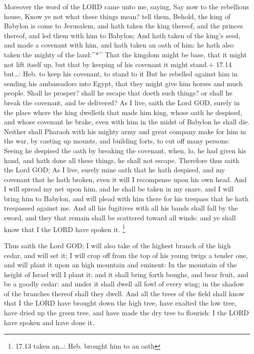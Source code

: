  Moreover the word of the LORD came unto me, saying,
 Say now to the rebellious house, Know ye not what these
things mean? tell them, Behold, the king of Babylon is come to
Jerusalem, and hath taken the king thereof, and the princes thereof, and
led them with him to Babylon;  And hath taken of the king's
seed, and made a covenant with him, and hath taken an oath of him: he
hath also taken the mighty of the land:\^{}*\^{}  That the
kingdom might be base, that it might not lift itself up, but that by
keeping of his covenant it might stand.+ 17.14 but\ldots: Heb. to keep
his covenant, to stand to it  But he rebelled against him
in sending his ambassadors into Egypt, that they might give him horses
and much people. Shall he prosper? shall he escape that doeth such
things? or shall he break the covenant, and be delivered? 
As I live, saith the Lord GOD, surely in the place where the king
dwelleth that made him king, whose oath he despised, and whose covenant
he brake, even with him in the midst of Babylon he shall die.
 Neither shall Pharaoh with his mighty army and great
company make for him in the war, by casting up mounts, and building
forts, to cut off many persons:  Seeing he despised the
oath by breaking the covenant, when, lo, he had given his hand, and hath
done all these things, he shall not escape.  Therefore thus
saith the Lord GOD; As I live, surely mine oath that he hath despised,
and my covenant that he hath broken, even it will I recompense upon his
own head.  And I will spread my net upon him, and he shall
be taken in my snare, and I will bring him to Babylon, and will plead
with him there for his trespass that he hath trespassed against me.
 And all his fugitives with all his bands shall fall by the
sword, and they that remain shall be scattered toward all winds: and ye
shall know that I the LORD have spoken it. \footnote{17.13 taken
  an\ldots: Heb. brought him to an oath}

 Thus saith the Lord GOD; I will also take of the highest
branch of the high cedar, and will set it; I will crop off from the top
of his young twigs a tender one, and will plant it upon an high mountain
and eminent:  In the mountain of the height of Israel will
I plant it: and it shall bring forth boughs, and bear fruit, and be a
goodly cedar: and under it shall dwell all fowl of every wing; in the
shadow of the branches thereof shall they dwell.  And all
the trees of the field shall know that I the LORD have brought down the
high tree, have exalted the low tree, have dried up the green tree, and
have made the dry tree to flourish: I the LORD have spoken and have done
it.

